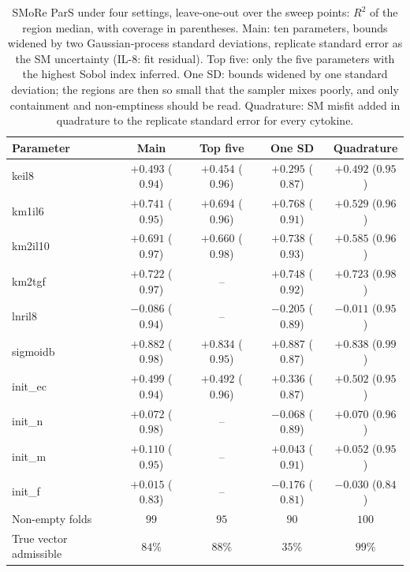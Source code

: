 \begin{table}[h]
\centering\footnotesize
\caption{SMoRe ParS under four settings, leave-one-out over the sweep points: $R^2$ of the region median, with coverage in parentheses. Main: ten parameters, bounds widened by two Gaussian-process standard deviations, replicate standard error as the SM uncertainty (IL-8: fit residual). Top five: only the five parameters with the highest Sobol index inferred. One SD: bounds widened by one standard deviation; the regions are then so small that the sampler mixes poorly, and only containment and non-emptiness should be read. Quadrature: SM misfit added in quadrature to the replicate standard error for every cytokine.}
\label{tab:app_ident}
\setlength{\tabcolsep}{4pt}
\begin{tabular}{lcccc}
\toprule
\textbf{Parameter} & \textbf{Main} & \textbf{Top five} & \textbf{One SD} & \textbf{Quadrature} \\
\midrule
keil8 & $+0.493$ ($0.94$) & $+0.454$ ($0.96$) & $+0.295$ ($0.87$) & $+0.492$ ($0.95$) \\
km1il6 & $+0.741$ ($0.95$) & $+0.694$ ($0.96$) & $+0.768$ ($0.91$) & $+0.529$ ($0.96$) \\
km2il10 & $+0.691$ ($0.97$) & $+0.660$ ($0.98$) & $+0.738$ ($0.93$) & $+0.585$ ($0.96$) \\
km2tgf & $+0.722$ ($0.97$) & -- & $+0.748$ ($0.92$) & $+0.723$ ($0.98$) \\
lnril8 & $-0.086$ ($0.94$) & -- & $-0.205$ ($0.89$) & $-0.011$ ($0.95$) \\
sigmoidb & $+0.882$ ($0.98$) & $+0.834$ ($0.95$) & $+0.887$ ($0.87$) & $+0.838$ ($0.99$) \\
init\_ec & $+0.499$ ($0.94$) & $+0.492$ ($0.96$) & $+0.336$ ($0.87$) & $+0.502$ ($0.95$) \\
init\_n & $+0.072$ ($0.98$) & -- & $-0.068$ ($0.89$) & $+0.070$ ($0.96$) \\
init\_m & $+0.110$ ($0.95$) & -- & $+0.043$ ($0.91$) & $+0.052$ ($0.95$) \\
init\_f & $+0.015$ ($0.83$) & -- & $-0.176$ ($0.81$) & $-0.030$ ($0.84$) \\
\midrule
Non-empty folds & $99$ & $95$ & $90$ & $100$ \\
True vector admissible & $84\%$ & $88\%$ & $35\%$ & $99\%$ \\
\bottomrule
\end{tabular}
\end{table}
